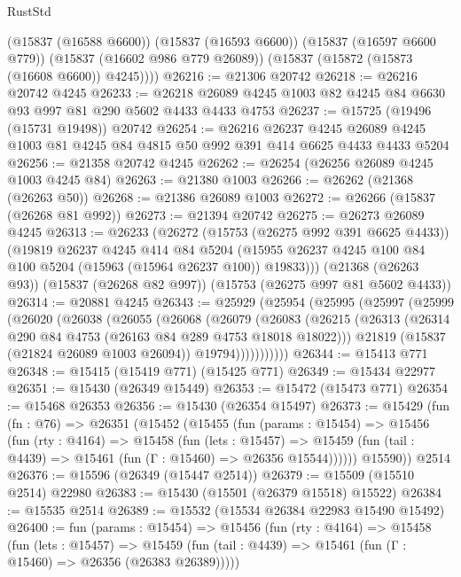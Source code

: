 \begin{lexlean}{RustStd}
\begin{coremodule}
{\begin{coremodule}
{{{{{{{{{{{{{{{{{{{{{{{{{{{{{{{{{{{{{{{{{{{{{{{{{{{{{{{{{{{{        (@15837 (@16588 @6600))
        (@15837 (@16593 @6600))
        (@15837 (@16597 @6600 @779))
        (@15837 (@16602 @986 @779 @26089))
        (@15837 (@15872 (@15873 (@16608 @6600)) @4245))))
@26216 := @21306 @20742
@26218 := @26216 @20742 @4245
@26233 := @26218 @26089 @4245 @1003 @82 @4245 @84 @6630 @93 @997 @81 @290 @5602 @4433 @4433 @4753
@26237 := @15725 (@19496 (@15731 @19498)) @20742
@26254 := @26216
    @26237
    @4245
    @26089
    @4245
    @1003
    @81
    @4245
    @84
    @4815
    @50
    @992
    @391
    @414
    @6625
    @4433
    @4433
    @5204
@26256 := @21358 @20742 @4245
@26262 := @26254 (@26256 @26089 @4245 @1003 @4245 @84)
@26263 := @21380 @1003
@26266 := @26262 (@21368 (@26263 @50))
@26268 := @21386 @26089 @1003
@26272 := @26266 (@15837 (@26268 @81 @992))
@26273 := @21394 @20742
@26275 := @26273 @26089 @4245
@26313 := @26233
    (@26272
      (@15753 (@26275 @992 @391 @6625 @4433))
      (@19819
        @26237
        @4245
        @414
        @84
        @5204
        (@15955 @26237 @4245 @100 @84 @100 @5204 (@15963 (@15964 @26237 @100)) @19833)))
    (@21368 (@26263 @93))
    (@15837 (@26268 @82 @997))
    (@15753 (@26275 @997 @81 @5602 @4433))
@26314 := @20881 @4245
@26343 := @25929
    (@25954
      (@25995
        (@25997
          (@25999
            (@26020
              (@26038
                (@26055
                  (@26068
                    (@26079
                      (@26083
                        (@26215
                          (@26313 (@26314 @290 @84 @4753 (@26163 @84 @289 @4753 @18018 @18022)))
                          @21819
                          (@15837 (@21824 @26089 @1003 @26094))
                          @19794)))))))))))
@26344 := @15413 @771
@26348 := @15415 (@15419 @771) (@15425 @771)
@26349 := @15434 @22977
@26351 := @15430 (@26349 @15449)
@26353 := @15472 (@15473 @771)
@26354 := @15468 @26353
@26356 := @15430 (@26354 @15497)
@26373 := @15429
    (fun (fn : @76) =>
    @26351
      (@15452
        (@15455
          (fun (params : @15454) =>
          @15456
            (fun (rty : @4164) =>
            @15458
              (fun (lets : @15457) =>
              @15459 (fun (tail : @4439) => @15461 (fun (Γ : @15460) => @26356 @15544))))))
        @15590))
    @2514
@26376 := @15596 (@26349 (@15447 @2514))
@26379 := @15509 (@15510 @2514) @22980
@26383 := @15430 (@15501 (@26379 @15518) @15522)
@26384 := @15535 @2514
@26389 := @15532 (@15534 @26384 @22983 @15490 @15492)
@26400 := fun (params : @15454) =>
  @15456
    (fun (rty : @4164) =>
    @15458
      (fun (lets : @15457) =>
      @15459 (fun (tail : @4439) => @15461 (fun (Γ : @15460) => @26356 (@26383 @26389)))))
}}}}}}}}}}}}}}}}}}}}}}}}}}}}}}}}}}}}}}}}}}}}}}}}}}}}}}}}}}}}
\end{coremodule}}
\end{coremodule}
\end{lexlean}
